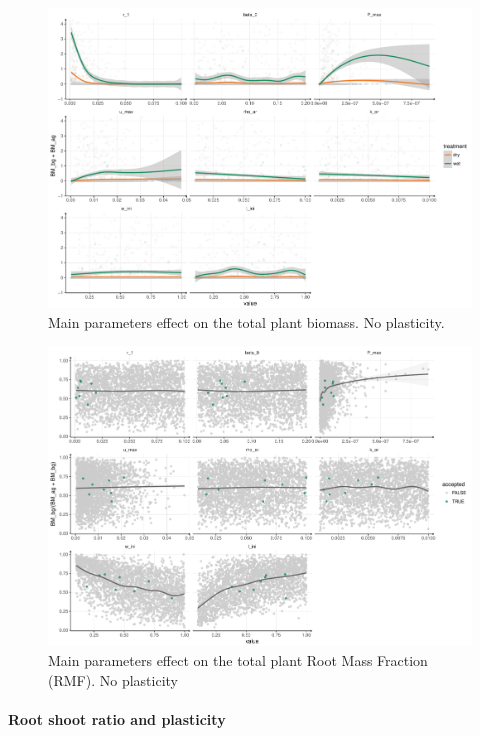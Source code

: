 \begin{figure}\label{fig:sensitivity_BM}
\includegraphics[width = \textwidth]{./2_PP/Figures/par_effect_none_BM.pdf}
\caption{Main parameters effect on the total plant biomass. No plasticity.}
\end{figure}

\begin{figure}\label{fig:sensitivity_RSR}
\includegraphics[width = \textwidth]{./2_PP/Figures/par_effect_none_RSR.pdf}
\caption{Main parameters effect on the total plant Root Mass Fraction (RMF). No plasticity}
\end{figure}

\paragraph{Root shoot ratio and plasticity}


